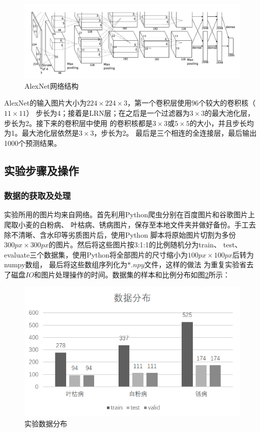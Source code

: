   \begin{figure}[htbp]
    \centering
    \includegraphics[width=\textwidth]{resource/AlexNet.png}
    \caption{AlexNet网络结构}
    \label{Figure.Third.3}
  \end{figure}
  AlexNet的输入图片大小为$224\times224\times3$，第一个卷积层使用96个较大的卷积核（$11\times11$）
  步长为4；接着是LRN层；在之后是一个过滤器为$3\times3$的最大池化层，步长为2。接下来的卷积层中使用
  的卷积核都是$3\times3$或$5\times5$的大小，并且步长均为1。最大池化层依然是$3\times3$，步长为2。
  最后是三个相连的全连接层，最后输出1000个预测结果。

\subsection{\hei\xiaosan\textbf{实验步骤及操作}}
  \subsubsection{\hei\sihao\textbf{数据的获取及处理}}
    实验所用的图片均来自网络。首先利用Python爬虫分别在百度图片和谷歌图片上爬取小麦的白粉病、
    叶枯病、锈病图片，保存至本地文件夹并做好备份。手工去除不清晰、含水印等劣质图片后，使用Python
    脚本将原始图片切割为多份$300px\times300px$的图片。然后将这些图片按3:1:1的比例随机分为train、
    test、evaluate三个数据集，使用Python将全部图片的尺寸缩小为$100px\times100px$后转为numpy数组，
    最后将这些数组序列化为$*.npy$文件，这样的做法
    为重复实验省去了磁盘$IO$和图片处理操作的时间。数据集的样本和比例分布如图\ref{Figure.Third.4}所示：
    \begin{figure}[H]
      \centering
      \includegraphics[width=.5\textwidth]{resource/数据分布.bmp}
      \caption{实验数据分布}
      \label{Figure.Third.4}
    \end{figure}

